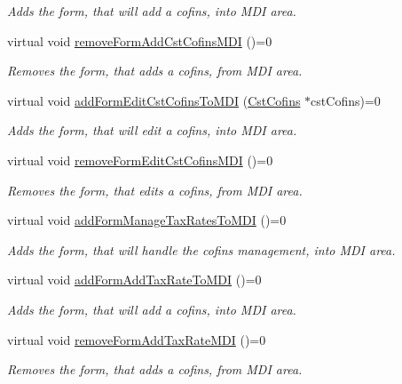 \begin{DoxyCompactItemize}
\begin{DoxyCompactList}\small\item\em \-Adds the form, that will add a cofins, into \-M\-D\-I area. \end{DoxyCompactList}\item 
virtual void \hyperlink{class_i_main_window_a45ea375512f7dad270bc64fd1cd72062}{remove\-Form\-Add\-Cst\-Cofins\-M\-D\-I} ()=0
\begin{DoxyCompactList}\small\item\em \-Removes the form, that adds a cofins, from \-M\-D\-I area. \end{DoxyCompactList}\item 
virtual void \hyperlink{class_i_main_window_adfc6e71cde32b9ae6349e0cde20ce392}{add\-Form\-Edit\-Cst\-Cofins\-To\-M\-D\-I} (\hyperlink{class_cst_cofins}{\-Cst\-Cofins} $\ast$cst\-Cofins)=0
\begin{DoxyCompactList}\small\item\em \-Adds the form, that will edit a cofins, into \-M\-D\-I area. \end{DoxyCompactList}\item 
virtual void \hyperlink{class_i_main_window_ac495161c5a83538d2fe41389b9191863}{remove\-Form\-Edit\-Cst\-Cofins\-M\-D\-I} ()=0
\begin{DoxyCompactList}\small\item\em \-Removes the form, that edits a cofins, from \-M\-D\-I area. \end{DoxyCompactList}\item 
virtual void \hyperlink{class_i_main_window_afbcd7e5377b7269fc431975b799e01e9}{add\-Form\-Manage\-Tax\-Rates\-To\-M\-D\-I} ()=0
\begin{DoxyCompactList}\small\item\em \-Adds the form, that will handle the cofins management, into \-M\-D\-I area. \end{DoxyCompactList}\item 
virtual void \hyperlink{class_i_main_window_a14edb16f378c2887910a4bf162a6ea34}{add\-Form\-Add\-Tax\-Rate\-To\-M\-D\-I} ()=0
\begin{DoxyCompactList}\small\item\em \-Adds the form, that will add a cofins, into \-M\-D\-I area. \end{DoxyCompactList}\item 
virtual void \hyperlink{class_i_main_window_ae3c4110fb7687fb2c26a4e87fade34c4}{remove\-Form\-Add\-Tax\-Rate\-M\-D\-I} ()=0
\begin{DoxyCompactList}\small\item\em \-Removes the form, that adds a cofins, from \-M\-D\-I area. \end{DoxyCompactList}\item 

\end{DoxyCompactItemize}
